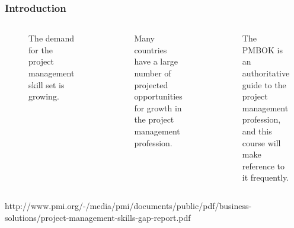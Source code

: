 \documentclass{beamer}
\begin{document}
\begin{frame}[fragile]
\frametitle{Introduction}
\begin{columns}
\begin{figure}
\caption{The demand for the project management skill set is growing.}
\end{figure}
\vspace{-0.8cm}
\begin{figure}
\caption{Many countries have a large number of projected opportunities for growth in the project management profession.}
\end{figure}
\begin{figure}
\caption{The PMBOK is an authoritative guide to the project management profession, and this course will make reference to it frequently.}
\end{figure}
\end{columns}
\vspace{-0.1cm}
\tiny http://www.pmi.org/-/media/pmi/documents/public/pdf/business-solutions/project-management-skills-gap-report.pdf
\end{frame}
\end{document}
